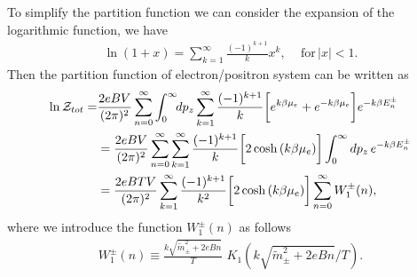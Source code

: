 \documentclass[Universe,article,submit,moreauthors,pdftex]{Definitions/mdpi}
\begin{document}
To simplify the partition function we can consider the expansion of the logarithmic function, we have
\begin{align}
\ln\left(1+x\right)=\sum^{\infty}_{k=1}\frac{(-1)^{k+1}}{k}x^k, \,\,\,\,\,\,\,\mathrm{for}\,|x|<1.
\end{align}
Then the partition function of electron/positron system can be written as
\begin{align}
\ln\mathcal{Z}_{tot}=&\frac{2eBV}{(2\pi)^2}\sum_{n=0}^\infty\int^\infty_{0} \!\!dp_z\sum^{\infty}_{k=1}\frac{(-1)^{k+1}}{k}\bigg[e^{k\beta\mu_e}+e^{-k\beta\mu_e}\bigg]e^{-k\beta E_n^\pm}\notag\\
&=\frac{2eBV}{(2\pi)^2}\sum_{n=0}^\infty\sum^{\infty}_{k=1}\frac{(-1)^{k+1}}{k}\bigg[2\cosh{(k\beta\mu_e)}\bigg]\int_0^\infty dp_z\,e^{-k\beta E_n^\pm}\notag\\
&=\frac{2eBTV}{(2\pi)^2}\sum^{\infty}_{k=1}\frac{(-1)^{k+1}}{k^2}\bigg[2\cosh{(k\beta\mu_e)}\bigg]\sum_{n=0}^\infty W^\pm_1(n),
\end{align}
where we introduce the function $W^\pm_1(n)$ as follows
\begin{align}
W^\pm_1(n)\equiv\frac{k\sqrt{\tilde{m}^2_\pm+2eBn}}{T}\,\,K_1\!\!\left({k\sqrt{\tilde{m}^2_\pm+2eBn}}/{T}\right).
\end{align}
\end{document}
